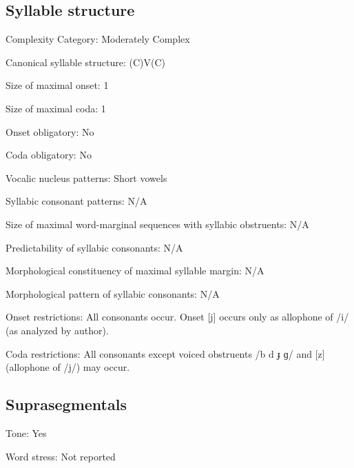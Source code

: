 {\subsection*{Syllable structure}
\begin{appendixdesc}

\item[Complexity Category:] Moderately Complex

\item[Canonical syllable structure:] (C)V(C) \citep[53--58]{Jakobi1990}

\item[Size of maximal onset:] 1

\item[Size of maximal coda:] 1

\item[Onset obligatory:] No

\item[Coda obligatory:] No

\item[Vocalic nucleus patterns:] Short vowels

\item[Syllabic consonant patterns:] N/A

\item[Size of maximal word-marginal sequences with syllabic obstruents:] N/A

\item[Predictability of syllabic consonants:] N/A

\item[Morphological constituency of maximal syllable margin:] N/A

\item[Morphological pattern of syllabic consonants:] N/A

\item[Onset restrictions:] All consonants occur. Onset [j] occurs only as allophone of /i/ (as analyzed by author).

\item[Coda restrictions:] All consonants except voiced obstruents /b d ɟ ɡ/ and [z] (allophone of /j/) may occur.
\end{appendixdesc}
\subsection*{Suprasegmentals}
\begin{appendixdesc}
\item[Tone:] Yes

\item[Word stress:] Not reported
\end{appendixdesc}
}
